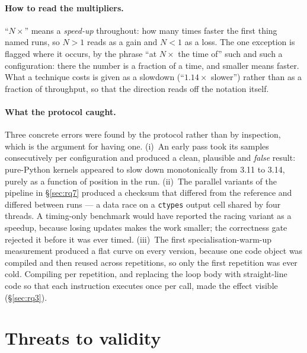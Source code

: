 \documentclass[10pt,a4paper]{article}
\newcommand{\meas}[2]{#2}
\newcommand{\code}[1]{\texttt{\small #1}}
\begin{document}
\paragraph{How to read the multipliers.} ``$N\times$'' means a \emph{speed-up} throughout: how
many times faster the first thing named runs, so $N>1$ reads as a gain and $N<1$ as a loss. The
one exception is flagged where it occurs, by the phrase ``at $N\times$ the time of'' such and
such a configuration: there the number is a fraction of a time, and smaller means faster. What
a technique costs is given as a slowdown (``$\meas{ratio:b4_threads-ft:single_thread_arith/ft|b4_threads-gil:single_thread_arith/gil}{1.14}\times$ slower'') rather than as a
fraction of throughput, so that the direction reads off the notation itself.

\paragraph{What the protocol caught.}
Three concrete errors were found by the protocol rather than by inspection, which is the
argument for having one. (i)~An early pass took its samples consecutively per configuration
and produced a clean, plausible and \emph{false} result: pure-Python kernels appeared to slow
down monotonically from 3.11 to 3.14, purely as a function of position in the run. (ii)~The parallel variants of the pipeline in
\S\ref{sec:rq7} produced a checksum that differed from the reference and differed between
runs --- a data race on a \code{ctypes} output cell shared by four threads. A timing-only benchmark would have reported the racing variant as a speedup, because losing
updates makes the work smaller; the correctness gate rejected it before it was ever timed. (iii)~The first specialisation-warm-up measurement
produced a flat curve on every version, because one code object was compiled and then reused
across repetitions, so only the first repetition was ever cold. Compiling per repetition, and
replacing the loop body with straight-line code so that each instruction executes once per
call, made the effect visible (\S\ref{sec:rq3}).





\section{Threats to validity}
\label{sec:threats}
\end{document}
